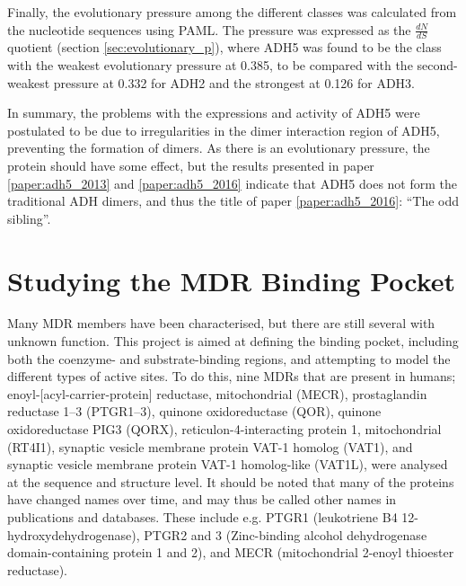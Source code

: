 \documentclass[a4paper, twoside, 12pt, openright]{report}
\begin{document}
Finally, the evolutionary pressure among the different classes was calculated from the nucleotide sequences using PAML. The pressure was expressed as the $\frac{dN}{dS}$ quotient (section \ref{sec:evolutionary_p}), where ADH5 was found to be the class with the weakest evolutionary pressure at 0.385, to be compared with the second-weakest pressure at 0.332 for ADH2 and the strongest at 0.126 for ADH3.

In summary, the problems with the expressions and activity of ADH5 were postulated to be due to irregularities in the dimer interaction region of ADH5, preventing the formation of dimers. As there is an evolutionary pressure, the protein should have some effect, but the results presented in paper \ref{paper:adh5_2013} and \ref{paper:adh5_2016} indicate that ADH5 does not form the traditional ADH dimers, and thus the title of paper \ref{paper:adh5_2016}: ``The odd sibling''.

\section{Studying the MDR Binding Pocket}
\label{sec:mdr_pocket}

Many MDR members have been characterised, but there are still several with unknown function. This project is aimed at defining the binding pocket, including both the coenzyme- and substrate-binding regions, and attempting to model the different types of active sites. To do this, nine MDRs that are present in humans; enoyl-[acyl-carrier-protein] reductase, mitochondrial (MECR)\cite{chen_structural_2008},  prostaglandin reductase 1--3 (PTGR1--3)\cite{yokomizo_cdna_1996, wu_structural_2008, yu_prostaglandin_2013}, quinone oxidoreductase (QOR)\cite{fernandez_human_2007}, quinone oxidoreductase PIG3 (QORX)\cite{porte_three-dimensional_2009},  reticulon-4-interacting protein 1, mitochondrial (RT4I1)\cite{hu_identification_2002},  synaptic vesicle membrane protein VAT-1 homolog (VAT1)\cite{koch_human_2003},  and synaptic vesicle membrane protein VAT-1 homolog-like (VAT1L),  were analysed at the sequence and structure level. It should be noted that many of the proteins have changed names over time, and may thus be called other names in publications and databases. These include e.g. PTGR1 (leukotriene B4 12-hydroxydehydrogenase), PTGR2 and 3 (Zinc-binding alcohol dehydrogenase domain-containing protein 1 and 2), and MECR (mitochondrial 2-enoyl thioester reductase).
\end{document}
